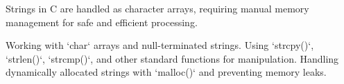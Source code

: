 \begin{comment}
5.5 C11 (2011 - 2018) – Multi-threaded and Secure String Handling
5.5.1 Secure String Functions

5.5.1.1 strncpy vs strlcpy

5.5.1.2 Bounds Checking for Safer String Handling

5.5.2 Atomic String Manipulation

5.5.2.1 _Atomic for Safe Concurrent Text Processing

5.5.2.2 Multi-threaded String Storage Considerations

5.6 C17 and Beyond – Future of String Handling in C
5.6.1 Compiler Optimizations for String Processing

5.6.1.1 SIMD-Based String Operations (#include <immintrin.h>)

5.6.1.2 Fast Memory Copy Using AVX Instructions

5.6.2 Alternatives to Null-Terminated Strings

5.6.2.1 Safer Encapsulation of String Data

5.6.2.2 Rust-Like Memory-Safe String Representations
\end{comment}

\begin{NxSBox}
	\begin{NxIDBox}
		Strings in C are handled as character arrays, requiring manual memory management for safe and efficient processing.
	\end{NxIDBox}
	\begin{NxIDBoxL}
		 Working with `char` arrays and null-terminated strings.
		 Using `strcpy()`, `strlen()`, `strcmp()`, and other standard functions for manipulation.
		 Handling dynamically allocated strings with `malloc()` and preventing memory leaks.
	\end{NxIDBoxL}
\end{NxSBox}

